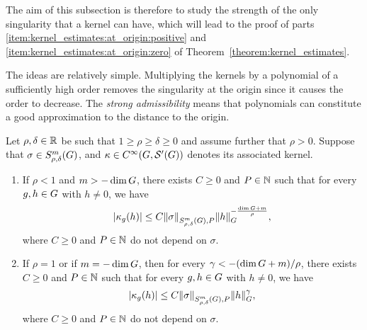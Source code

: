 The aim of this subsection is therefore to study the strength of the only singularity that a kernel can have,
which will lead to the proof of parts \ref{item:kernel_estimates:at_origin:positive} and \ref{item:kernel_estimates:at_origin:zero} of Theorem~\ref{theorem:kernel_estimates}.

The ideas are relatively simple.
Multiplying the kernels by a polynomial of a sufficiently high order removes the singularity at the origin
since it causes the order to decrease.
The \emph{strong admissibility} means that polynomials can constitute a good approximation to the distance to the origin.

\begin{theorem}
\label{theorem:kernel_estimates:at_origin}
    Let $\rho, \delta \in \R$ be such that $1 \geq \rho \geq \delta \geq 0$
    and assume further that $\rho > 0$.
    Suppose that $\sigma \in \SymbolClass{m}{\rho, \delta}$,
    and $\kappa \in \SmoothFunctions {\Group, \TemperedDistributions \Group}$ denotes its associated kernel.
    \begin{enumerate}
        \item
            If $\rho < 1$ and $m > -\dim \Group$, there exists $C \geq 0$ and $P \in \N$ such that for every $g, h \in \Group$ with $h \neq 0$, we have
            \begin{align*}
                \abs{\kappa_g(h)} \leq C \SymbolSemiNorm m {\rho, \delta} P \sigma \norm [\Group] h^{- \frac{\dim \Group + m}{\rho}},
            \end{align*}
            where $C \geq 0$ and $P \in \N$ do not depend on $\sigma$.
        \item
            If $\rho = 1$ or if $m = -\dim \Group$,
            then for every $\gamma < -(\dim \Group + m)/\rho$,
            there exists $C \geq 0$ and $P \in \N$ such that for every $g, h \in \Group$ with $h \neq 0$, we have
            \begin{align*}
                \abs{\kappa_g(h)} \leq C \SymbolSemiNorm m {\rho, \delta} P \sigma \norm [\Group] h^\gamma,
            \end{align*}
            where $C \geq 0$ and $P \in \N$ do not depend on $\sigma$.
    \end{enumerate}
\end{theorem}
